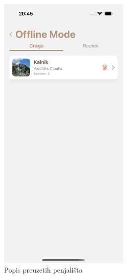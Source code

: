 \begin{figure}[H]
    \centering
    \begin{subfigure}[b]{0.4\textwidth}
        \centering
        \includegraphics[width=0.7\textwidth]{images/implementacija/offline-mode/crag-tab.png}
        \caption{Popis preuzetih penjališta}
        \label{fig:offline_crag_tab}
    \end{subfigure}
    \hspace{0.08\textwidth}
    \begin{subfigure}[b]{0.4\textwidth}
        \centering

\end{subfigure}
\end{figure}
